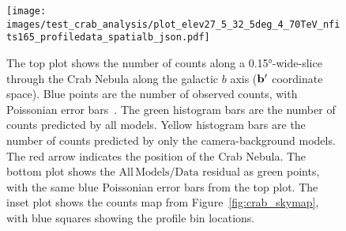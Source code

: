   \begin{figure}[p]
    \centering
    \texttt{[image: images/test\_crab\_analysis/plot\_elev27\_5\_32\_5deg\_4\_70TeV\_nfits165\_profiledata\_spatialb\_json.pdf]}
    \caption[Crab Nebula Profile along Galactic $b$]
    {
      The top plot shows the number of counts along a \ang{0.15}-wide-slice through the Crab Nebula along the galactic $b$ axis ($\mathbf{b'}$ coordinate space).
      Blue points are the number of observed counts, with Poissonian error bars~\cite{poissonfrequentistinterval}.
      The green histogram bars are the number of counts predicted by all models.
      Yellow histogram bars are the number of counts predicted by only the camera-background models.
      The red arrow indicates the position of the Crab Nebula.
      The bottom plot shows the $\mathrm{All\,Models}/\mathrm{Data}$ residual as green points, with the same blue Poissonian error bars from the top plot.
      The inset plot shows the counts map from Figure~\ref{fig:crab_skymap}, with blue squares showing the profile bin locations.
    }
    \label{fig:crab_profile_b}
  \end{figure}
    
